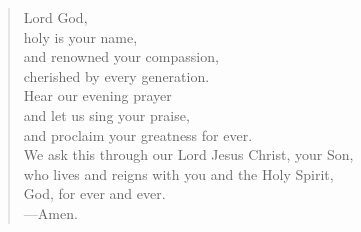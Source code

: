 \prayer

\setlength{\leftmargini}{\prayerleftmargini}

\begin{verse}
Lord God,\\
holy is your name,\\
and renowned your compassion,\\
cherished by every generation.\\
Hear our evening prayer\\
and let us sing your praise,\\
and proclaim your greatness for ever.\\
We ask this through our Lord Jesus Christ, your Son,\\
who lives and reigns with you and the Holy Spirit,\\
God, for ever and ever.\\
{\color{red}---\thinspace}Amen.
\end{verse}

\setlength{\leftmargini}{\defleftmargini}